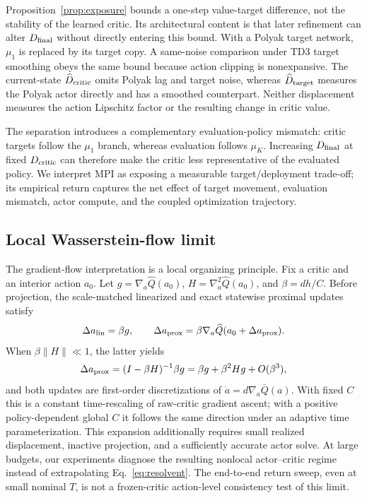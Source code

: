 Proposition~\ref{prop:exposure} bounds a one-step value-target difference, not
the stability of the learned critic. Its architectural content is that later
refinement can alter $D_{\rm final}$ without directly entering this bound.
With a Polyak target network, $\mu_1$ is replaced by its target copy. A
same-noise comparison under TD3 target smoothing obeys the same bound because
action clipping is nonexpansive. The current-state
$\widehat D_{\rm critic}$ omits Polyak lag and target noise, whereas
$\widehat D_{\rm target}$ measures the Polyak actor directly and has a
smoothed counterpart. Neither displacement measures the action Lipschitz
factor or the resulting change in critic value.

The separation introduces a complementary evaluation-policy mismatch: critic
targets follow the $\mu_1$ branch, whereas evaluation follows $\mu_K$.
Increasing $D_{\rm final}$ at fixed $D_{\rm critic}$ can therefore make the
critic less representative of the evaluated policy. We interpret MPI as
exposing a measurable target/deployment trade-off; its empirical return
captures the net effect of target movement, evaluation mismatch, actor compute,
and the coupled optimization trajectory.

\subsection{Local Wasserstein-flow limit}
\label{sec:local_limit}

The gradient-flow interpretation is a local organizing principle. Fix a critic
and an interior action $a_0$. Let $g=\nabla_a\widehat Q(a_0)$,
$H=\nabla_a^2\widehat Q(a_0)$, and $\beta=dh/C$. Before projection, the
scale-matched linearized and exact statewise proximal updates satisfy
\begin{equation}
\Delta a_{\rm lin}=\beta g,
\qquad
\Delta a_{\rm prox}=\beta\nabla_a\widehat Q(a_0+\Delta a_{\rm prox}).
\label{eq:local_steps}
\end{equation}
When $\beta\|H\|\ll1$, the latter yields
\begin{equation}
\Delta a_{\rm prox}=(I-\beta H)^{-1}\beta g
=\beta g+\beta^2Hg+O(\beta^3),
\label{eq:resolvent}
\end{equation}
and both updates are first-order discretizations of
$\dot a=d\nabla_a\bar Q(a)$. With fixed $C$ this is a constant
time-rescaling of raw-critic gradient ascent; with a positive policy-dependent
global $C$ it follows the same direction under an adaptive time
parameterization. This expansion additionally requires small realized
displacement, inactive projection, and a sufficiently accurate actor solve.
At large budgets, our experiments diagnose the resulting nonlocal
actor--critic regime instead of extrapolating Eq.~\eqref{eq:resolvent}. The
end-to-end return sweep, even at small nominal $T$, is not a frozen-critic
action-level consistency test of this limit.

